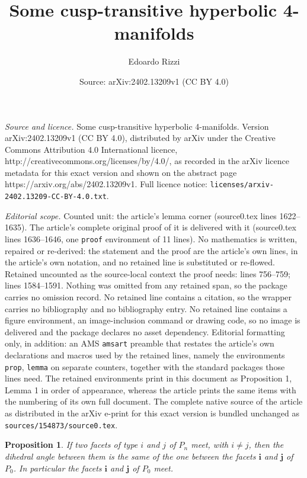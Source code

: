 \documentclass[10pt,a4paper]{amsart}
\title{Some cusp-transitive hyperbolic 4-manifolds}
\author{Edoardo Rizzi}
\date{Source: arXiv:2402.13209v1 (CC BY 4.0)}
\newtheorem{prop}{Proposition}
\begin{document}
\maketitle

\noindent\emph{Source and licence.} Some cusp-transitive hyperbolic 4-manifolds. Version arXiv:2402.13209v1 (CC BY 4.0), distributed by arXiv under the Creative Commons Attribution 4.0 International licence, http://creativecommons.org/licenses/by/4.0/, as recorded in the arXiv licence metadata for this exact version and shown on the abstract page https://arxiv.org/abs/2402.13209v1. Full licence notice: \texttt{licenses/arxiv-2402.13209-CC-BY-4.0.txt}.\par\smallskip

\noindent\textit{Editorial scope.} Counted unit: the article's lemma corner (source0.tex lines 1622--1635). The article's complete original proof of it is delivered with it (source0.tex lines 1636--1646, one \texttt{proof} environment of 11 lines). No mathematics is written, repaired or re-derived: the statement and the proof are the article's own lines, in the article's own notation, and no retained line is substituted or re-flowed.  Retained uncounted as the source-local context the proof needs: lines 756--759; lines 1584--1591.  Nothing was omitted from any retained span, so the package carries no omission record.  No retained line contains a citation, so the wrapper carries no bibliography and no bibliography entry.  No retained line contains a figure environment, an image-inclusion command or drawing code, so no image is delivered and the package declares no asset dependency.  Editorial formatting only, in addition: an AMS \texttt{amsart} preamble that restates the article's own declarations and macros used by the retained lines, namely the environments \texttt{prop}, \texttt{lemma} on separate counters, together with the standard packages those lines need.  The retained environments print in this document as Proposition 1, Lemma 1 in order of appearance, whereas the article prints the same items with the numbering of its own full document.  The complete native source of the article as distributed in the arXiv e-print for this exact version is bundled unchanged as \texttt{sources/154873/source0.tex}.
\begin{prop}
\label{angolo}
    If two facets of type $i$ and $j$ of $P_n$ meet, with $i\ne j$, then the dihedral angle between them is the same of the one between the facets $\textbf{i}$ and $\textbf{j}$ of $P_0$. In particular the facets $\textbf{i}$ and $\textbf{j}$ of $P_0$ meet.
\end{prop}
\end{document}
